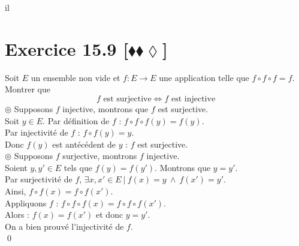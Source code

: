 il\documentclass[10pt]{article}
\begin{document}
\section*{Exercice 15.9 [$\blacklozenge\blacklozenge\lozenge$]}
\begin{tcolorbox}[enhanced, width=7.6in, center, size=fbox, fontupper=\large, drop shadow southwest]
    Soit $E$ un ensemble non vide et $f:E\to E$ une application telle que $f \circ f \circ f = f$.\\
    Montrer que
    \begin{equation*}
        f \text{ est surjective} \iff f \text{ est injective}
    \end{equation*}
    $\circledcirc$ Supposons $f$ injective, montrons que $f$ est surjective.\\
    Soit $y \in E$. Par définition de $f$ : $f \circ f \circ f(y) = f(y)$.\\
    Par injectivité de $f$ : $f\circ f(y) = y$.\\
    Donc $f(y)$ est antécédent de $y$ : $f$ est surjective.\\[0.1cm]
    $\circledcirc$ Supposons $f$ surjective, montrons $f$ injective.\\
    Soient $y, y' \in E$ tels que $f(y) = f(y')$. Montrons que $y=y'$.\\
    Par surjectivité de $f$, $\exists x,x' \in E ~ | ~ f(x) = y ~ \wedge ~ f(x') = y'$.\\
    Ainsi, $f\circ f(x) = f \circ f (x')$.\\
    Appliquons $f$ : $f \circ f \circ f(x) = f \circ f \circ f(x')$.\\
    Alors : $f(x) = f(x')$ et donc $y = y'$.\\
    On a bien prouvé l'injectivité de $f$.\\
    \qed
\end{tcolorbox}
\end{document}
